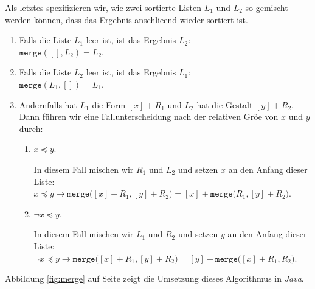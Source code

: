 Als letztes spezifizieren wir, wie zwei sortierte Listen $L_1$ 
und $L_2$ so gemischt werden k\"onnen, dass das Ergebnis anschlie\3end wieder sortiert ist.
\begin{enumerate}
\item Falls die Liste $L_1$ leer ist, ist das Ergebnis $L_2$: \\[0.2cm]
      \hspace*{1.3cm} 
      $\mathtt{merge}([], L_2) = L_2$.
\item Falls die Liste $L_2$ leer ist, ist das Ergebnis $L_1$: \\[0.2cm]
      \hspace*{1.3cm} 
      $\mathtt{merge}(L_1, []) = L_1$.
\item Andernfalls hat $L_1$ die Form $[x] + R_1$ und $L_2$ hat die Gestalt $[y] + R_2$.
      Dann f\"uhren wir eine Fallunterscheidung nach der relativen Gr\"o\3e von $x$ und $y$ durch:
      \begin{enumerate}
      \item $x \preceq y$.

            In diesem Fall mischen wir $R_1$ und $L_2$ und setzen $x$ an den Anfang dieser Liste:\\[0.2cm]
            \hspace*{1.3cm} 
            $x \preceq y \rightarrow \mathtt{merge}\bigl([x]+R_1, [y]+R_2\bigr) = [x] + \mathtt{merge}\bigl(R_1,[y]+R_2\bigr)$.
      \item $\neg x \preceq y$.

            In diesem Fall mischen wir $L_1$ und $R_2$ und setzen $y$ an den Anfang dieser Liste:\\[0.2cm]
            \hspace*{1.3cm} 
            $\neg x \preceq y \rightarrow \mathtt{merge}\bigl([x]+R_1, [y]+R_2\bigr) = [y] + \mathtt{merge}\bigl([x] + R_1,R_2\bigr)$.
      \end{enumerate}
\end{enumerate}
Abbildung \ref{fig:merge} auf Seite \pageref{fig:merge} 
zeigt die Umsetzung dieses Algorithmus in \textsl{Java}.

